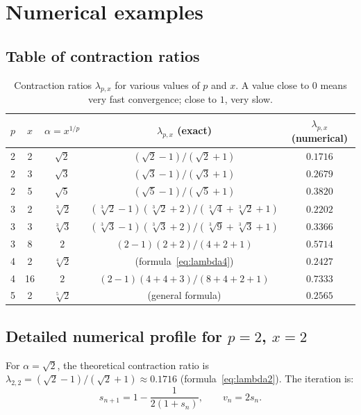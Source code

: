 \documentclass[11pt,a4paper]{article}
\theoremstyle{definition}
\newcommand{\cbrt}[1]{\sqrt[3]{#1}}
\begin{document}
\section{Numerical examples}
\label{sec:exemples}

\subsection{Table of contraction ratios}

\begin{table}[h]
\centering
\begin{tabular}{ccccc}
\toprule
$p$ & $x$ & $\alpha = x^{1/p}$ & $\lambda_{p,x}$ (exact) & $\lambda_{p,x}$ (numerical) \\
\midrule
2 & 2 & $\sqrt{2}$ & $(\sqrt{2}-1)/(\sqrt{2}+1)$ & $0.1716$ \\
2 & 3 & $\sqrt{3}$ & $(\sqrt{3}-1)/(\sqrt{3}+1)$ & $0.2679$ \\
2 & 5 & $\sqrt{5}$ & $(\sqrt{5}-1)/(\sqrt{5}+1)$ & $0.3820$ \\
\midrule
3 & 2 & $\cbrt{2}$ & $(\cbrt{2}-1)(\cbrt{2}+2)/(\cbrt{4}+\cbrt{2}+1)$ & $0.2202$ \\
3 & 3 & $\cbrt{3}$ & $(\cbrt{3}-1)(\cbrt{3}+2)/(\cbrt{9}+\cbrt{3}+1)$ & $0.3366$ \\
3 & 8 & $2$ & $(2-1)(2+2)/(4+2+1)$ & $0.5714$ \\
\midrule
4 & 2 & $\sqrt[4]{2}$ & (formula~\eqref{eq:lambda4}) & $0.2427$ \\
4 & 16 & $2$ & $(2-1)(4+4+3)/(8+4+2+1)$ & $0.7333$ \\
\midrule
5 & 2 & $\sqrt[5]{2}$ & (general formula) & $0.2565$ \\
\bottomrule
\end{tabular}
\caption{Contraction ratios $\lambda_{p,x}$ for various values of $p$ and $x$. A value close to $0$ means very fast convergence; close to $1$, very slow.}
\end{table}

\subsection{Detailed numerical profile for \texorpdfstring{$p=2$, $x=2$}{p=2, x=2}}

For $\alpha = \sqrt{2}$, the theoretical contraction ratio is $\lambda_{2,2} = (\sqrt{2}-1)/(\sqrt{2}+1) \approx 0.1716$ (formula~\eqref{eq:lambda2}). The iteration is:
\[
  s_{n+1} = 1 - \frac{1}{2(1 + s_n)}, \qquad v_n = 2s_n.
\]
\end{document}
